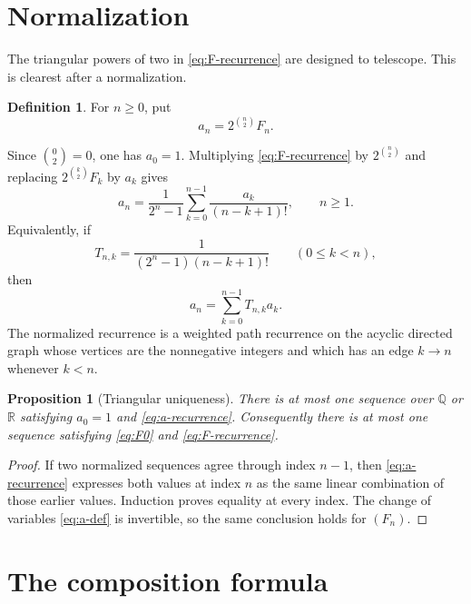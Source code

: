 \documentclass[11pt]{article}
\newtheorem{proposition}[theorem]{Proposition}
\theoremstyle{definition}
\newtheorem{definition}[theorem]{Definition}
\theoremstyle{remark}
\newcommand{\Q}{\mathbb{Q}}
\begin{document}
\section{Normalization}

The triangular powers of two in \eqref{eq:F-recurrence} are designed to
telescope.  This is clearest after a normalization.

\begin{definition}\label{def:a}
For $n\geq0$, put
\begin{equation}\label{eq:a-def}
 a_n=2^{\binom n2}F_n.
\end{equation}
\end{definition}

Since $\binom02=0$, one has $a_0=1$.  Multiplying
\eqref{eq:F-recurrence} by $2^{\binom n2}$ and replacing
$2^{\binom k2}F_k$ by $a_k$ gives
\begin{equation}\label{eq:a-recurrence}
 a_n=\frac{1}{2^n-1}
 \sum_{k=0}^{n-1}\frac{a_k}{(n-k+1)!},
 \qquad n\geq1.
\end{equation}
Equivalently, if
\begin{equation}\label{eq:Tweight}
 T_{n,k}=\frac{1}{(2^n-1)(n-k+1)!}
 \qquad (0\leq k<n),
\end{equation}
then
\begin{equation}\label{eq:a-weighted}
 a_n=\sum_{k=0}^{n-1}T_{n,k}a_k.
\end{equation}
The normalized recurrence is a weighted path recurrence on the acyclic
directed graph whose vertices are the nonnegative integers and which has an
edge $k\to n$ whenever $k<n$.

\begin{proposition}[Triangular uniqueness]\label{prop:uniqueness}
There is at most one sequence over $\Q$ or $\mathbb{R}$ satisfying
$a_0=1$ and \eqref{eq:a-recurrence}.  Consequently there is at most one
sequence satisfying \eqref{eq:F0} and \eqref{eq:F-recurrence}.
\end{proposition}

\begin{proof}
If two normalized sequences agree through index $n-1$, then
\eqref{eq:a-recurrence} expresses both values at index $n$ as the same
linear combination of those earlier values.  Induction proves equality at
every index.  The change of variables \eqref{eq:a-def} is invertible, so the
same conclusion holds for $(F_n)$.
\end{proof}

\section{The composition formula}
\end{document}
